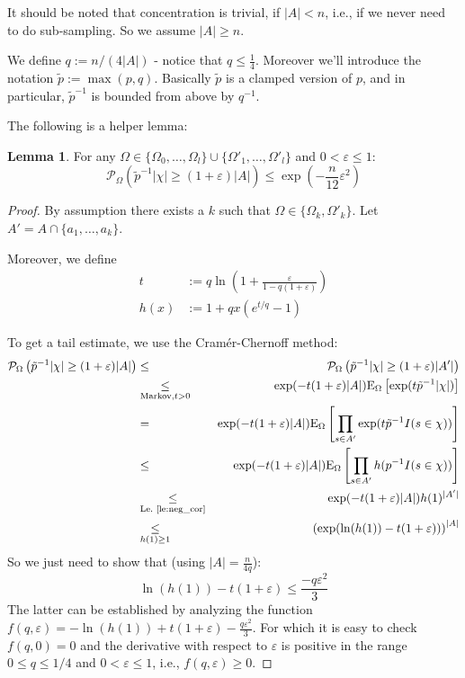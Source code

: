 \documentclass{article}
\newcommand{\prob}{\mathcal P}
\newcommand{\expectation}{\mathrm{E}}
\newcommand{\eps}{\varepsilon}
\theoremstyle{definition}
\newtheorem{lemma}{Lemma}
\begin{document}
It should be noted that concentration is trivial, if $|A| < n$, i.e., if we never need to do sub-sampling.
So we assume $|A| \geq n$.

We define $q := n/(4|A|)$ - notice that $q \leq \frac{1}{4}$. Moreover we'll introduce the notation $\tilde{p} := \max(p,q)$.
Basically $\tilde{p}$ is a clamped version of $p$, and in particular, $\tilde{p}^{-1}$ is bounded from above by $q^{-1}$.

The following is a helper lemma:
\begin{lemma}
\label{le:helper}
For any $\Omega \in \{\Omega_0,\ldots,\Omega_l\} \cup \{\Omega'_1,\ldots,\Omega'_l\}$ and $0 < \eps \leq 1$:
\[
\prob_{\Omega} \left( \tilde{p}^{-1} |\chi| \geq (1+\eps) |A| \right) \leq \exp\left(-\frac{n}{12} \eps^2\right)
\]
\end{lemma}
\begin{proof}
By assumption there exists a $k$ such that $\Omega \in \{\Omega_k, \Omega'_k\}$. Let $A' = A \cap \{a_1,\ldots,a_k\}$.

Moreover, we define
\begin{align*}
  t & := q \ln ( 1 + \frac{\eps}{1-q(1+\eps)}) \\
  h(x) & := 1+qx(e^{t/q}-1)  
\end{align*}

To get a tail estimate, we use the Cram\'{e}r-Chernoff method:
{\allowdisplaybreaks
\begin{eqnarray*}
  \prob_{\Omega} \left( \tilde{p}^{-1} |\chi| \geq (1+\eps) |A| \right) & \leq & \prob_{\Omega} \left( \tilde{p}^{-1} |\chi| \geq (1+\eps) |A'| \right) \\
  & \underset{\textrm{Markov,}t>0}{\leq} & \exp( -t (1+\eps) |A| ) \expectation_\Omega \left[ \exp ( t \tilde{p}^{-1} |\chi| ) \right] \\
 & = & \exp( -t (1+\eps) |A| ) \expectation_\Omega \left[ \prod_{s \in A'} \exp ( t \tilde{p}^{-1} I(s \in \chi) ) \right] \\
 & \leq & \exp( -t (1+\eps) |A| ) \expectation_\Omega \left[ \prod_{s \in A'} h( p^{-1} I(s \in \chi) ) \right] \\
 & \underset{\textrm{Le.~\ref{le:neg_cor}}}{\leq} & \exp( -t (1+\eps) |A| ) h(1)^{|A'|} \\
 & \underset{h(1)\geq 1}{\leq} & \left(\exp( \ln(h(1)) -t (1+\eps))\right) ^ {|A|} 
\end{eqnarray*}}
So we just need to show that (using $|A|=\frac{n}{4q}$):
\[
  \ln(h(1))-t (1+\eps) \leq \frac{-q \eps^2}{3}
\]
The latter can be established by analyzing the function $f(q,\eps) = -\ln (h(1)) +t (1+\eps) - \frac{q\eps^2}{3}$.
For which it is easy to check $f(q,0) = 0$ and the derivative with respect to $\eps$ is positive in the range $0 \leq q \leq 1/4$ and $0 < \eps \leq 1$, i.e.,
$f(q,\eps) \geq 0$.
\end{proof}
\end{document}
